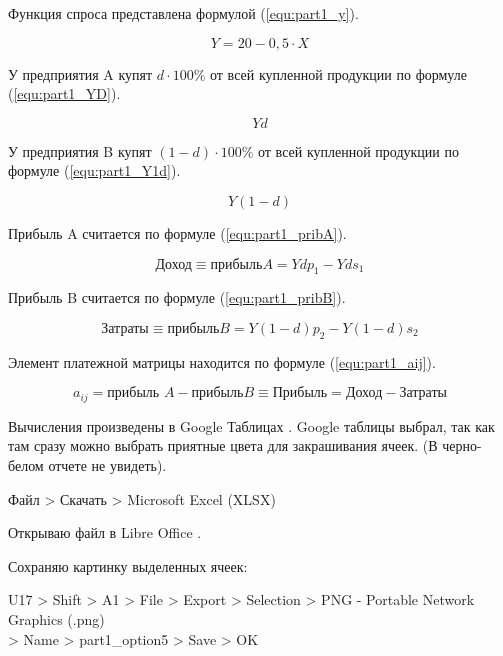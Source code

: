 Функция спроса представлена формулой (\ref{equ:part1_y}).

\begin{equation} \label{equ:part1_y}
  Y = 20 - 0,5 \cdot X
\end{equation}

У предприятия A купят $d \cdot 100\%$ от всей купленной продукции по формуле (\ref{equ:part1_YD}).

\begin{equation} \label{equ:part1_YD}
  Y d
\end{equation}

У предприятия B купят $(1-d) \cdot 100\%$ от всей купленной продукции по формуле (\ref{equ:part1_Y1d}).

\begin{equation} \label{equ:part1_Y1d}
  Y (1 - d)
\end{equation}

Прибыль A считается по формуле (\ref{equ:part1_pribA}).

\begin{equation} \label{equ:part1_pribA}
  \text{Доход} \equiv \text{прибыль}A = Y d p_1 - Y d s_1
\end{equation}

Прибыль B считается по формуле (\ref{equ:part1_pribB}).

\begin{equation} \label{equ:part1_pribB}
  \text{Затраты} \equiv \text{прибыль}B = Y (1-d) p_2 - Y (1-d) s_2
\end{equation}

Элемент платежной матрицы находится по формуле (\ref{equ:part1_aij}).

\begin{equation} \label{equ:part1_aij}
  a_{ij} = \text{прибыль }A - \text{прибыль}B \equiv \text{Прибыль} = \text{Доход} - \text{Затраты}
\end{equation}

\newpage

Вычисления произведены в Google Таблицах \cite{GoogleTables}.
Google таблицы выбрал, так как там сразу можно выбрать приятные цвета для закрашивания ячеек. (В черно-белом отчете не увидеть).

Файл > Скачать > Microsoft Excel (XLSX)

Открываю файл в Libre Office \cite{LibreOffice}.

Сохраняю картинку выделенных ячеек:

U17 > Shift > A1 > File > Export > Selection > PNG - Portable Network Graphics (.png) \\
> Name > part1\_option5 > Save > OK

